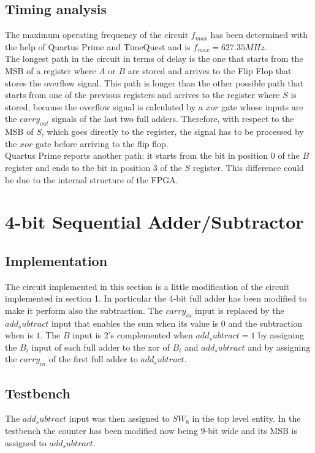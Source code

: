 \documentclass[12pt]{article}
\begin{document}
\subsection{Timing analysis}
The maximum operating frequency of the circuit $f_{max}$ has been determined with the help of Quartus Prime and TimeQuest and is $f_{max}=627.35MHz$.\\
The longest path in the circuit in terms of delay is the one that starts from the MSB of a register where $A$ or $B$ are stored and arrives to the Flip Flop that stores the overflow signal. This path is longer than the other possible path that starts from one of the previous registers and arrives to the register where $S$ is stored, because the overflow signal is calculated by a $xor$ gate whose inputs are the $carry_{out}$ signals of the last two full adders. Therefore, with respect to the MSB of $S$, which goes directly to the register, the signal has to be processed by the $xor$ gate before arriving to the flip flop.\\
Quartus Prime reports another path: it starts from the bit in position $0$ of the $B$ register and ends to the bit in position $3$ of the $S$ register. This difference could be due to the internal structure of the FPGA.



\section{4-bit Sequential Adder/Subtractor}
\subsection{Implementation}
The circuit implemented in this section is a little modification of the circuit implemented in section 1. In particular the  4-bit full adder has been modified to make it perform also the subtraction. The $carry_{in}$ input is replaced by the $add_subtract$ input  that enables the sum when its value is $0$ and the subtraction when is $1$. The $B$ input is 2's complemented when $add_subtract=1$ by assigning the $B_i$ input of each full adder to the xor of $B_i$ and $add_subtract$ and by assigning the $carry_{in}$ of the first full adder to $add_subtract$.\\ 
\subsection{Testbench}
The $add_subtract$ input was then assigned to $SW_8$ in the top level entity. In the testbench the counter has been modified now being 9-bit wide and its MSB is assigned to $add_subtract$.\\ 
\end{document}
